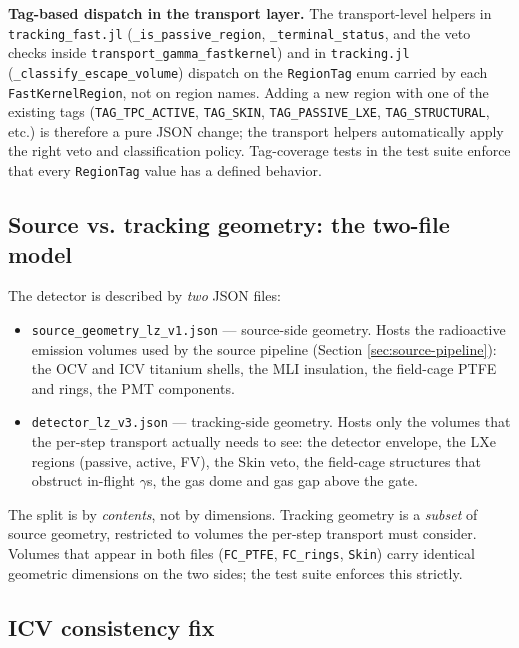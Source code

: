 \documentclass[11pt]{article}
\begin{document}
\textbf{Tag-based dispatch in the transport layer.} The transport-level
helpers in \texttt{tracking\_fast.jl} (\texttt{\_is\_passive\_region},
\texttt{\_terminal\_status}, and the veto checks inside
\texttt{transport\_gamma\_fastkernel}) and in \texttt{tracking.jl}
(\texttt{\_classify\_escape\_volume}) dispatch on the
\texttt{RegionTag} enum carried by each \texttt{FastKernelRegion}, not
on region names. Adding a new region with one of the existing tags
(\texttt{TAG\_TPC\_ACTIVE}, \texttt{TAG\_SKIN}, \texttt{TAG\_PASSIVE\_LXE},
\texttt{TAG\_STRUCTURAL}, etc.) is therefore a pure JSON change; the
transport helpers automatically apply the right veto and
classification policy. Tag-coverage tests in the test suite enforce
that every \texttt{RegionTag} value has a defined behavior.

\subsection{Source vs. tracking geometry: the two-file model}
\label{sec:geometry-twofile}

The detector is described by \emph{two} JSON files:

\begin{itemize}
\item \texttt{source\_geometry\_lz\_v1.json} --- source-side geometry. Hosts
the radioactive emission volumes used by the source pipeline (Section
\ref{sec:source-pipeline}): the OCV and ICV titanium shells, the MLI
insulation, the field-cage PTFE and rings, the PMT components.
\item \texttt{detector\_lz\_v3.json} --- tracking-side geometry. Hosts only
the volumes that the per-step transport actually needs to see: the detector
envelope, the LXe regions (passive, active, FV), the Skin veto, the
field-cage structures that obstruct in-flight $\gamma$s, the gas dome and
gas gap above the gate.
\end{itemize}

The split is by \emph{contents}, not by dimensions. Tracking geometry is a
\emph{subset} of source geometry, restricted to volumes the per-step
transport must consider. Volumes that appear in both files
(\texttt{FC\_PTFE}, \texttt{FC\_rings}, \texttt{Skin}) carry identical
geometric dimensions on the two sides; the test suite enforces this strictly.

\subsection{ICV consistency fix}
\label{sec:geometry-icvfix}
\end{document}
